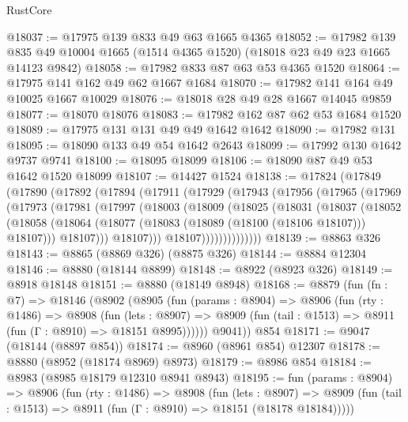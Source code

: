 \begin{lexlean}{RustCore}
\begin{coremodule}
@18037 := @17975 @139 @833 @49 @63 @1665 @4365
@18052 := @17982
    @139
    @835
    @49
    @10004
    @1665
    (@1514 @4365 @1520)
    (@18018 @23 @49 @23 @1665 @14123 @9842)
@18058 := @17982 @833 @87 @63 @53 @4365 @1520
@18064 := @17975 @141 @162 @49 @62 @1667 @1684
@18070 := @17982 @141 @164 @49 @10025 @1667 @10029
@18076 := @18018 @28 @49 @28 @1667 @14045 @9859
@18077 := @18070 @18076
@18083 := @17982 @162 @87 @62 @53 @1684 @1520
@18089 := @17975 @131 @131 @49 @49 @1642 @1642
@18090 := @17982 @131
@18095 := @18090 @133 @49 @54 @1642 @2643
@18099 := @17992 @130 @1642 @9737 @9741
@18100 := @18095 @18099
@18106 := @18090 @87 @49 @53 @1642 @1520 @18099
@18107 := @14427 @1524
@18138 := @17824
    (@17849
      (@17890
        (@17892
          (@17894
            (@17911
              (@17929
                (@17943
                  (@17956
                    (@17965
                      (@17969
                        (@17973
                          (@17981
                            (@17997
                              (@18003
                                (@18009
                                  (@18025
                                    (@18031
                                      (@18037
                                        (@18052
                                          (@18058
                                            (@18064
                                              (@18077
                                                (@18083 (@18089 (@18100 (@18106 @18107))) @18107)))
                                            @18107)))
                                      @18107)))
                                @18107))))))))))))))
@18139 := @8863 @326
@18143 := @8865 (@8869 @326) (@8875 @326)
@18144 := @8884 @12304
@18146 := @8880 (@18144 @8899)
@18148 := @8922 (@8923 @326)
@18149 := @8918 @18148
@18151 := @8880 (@18149 @8948)
@18168 := @8879
    (fun (fn : @7) =>
    @18146
      (@8902
        (@8905
          (fun (params : @8904) =>
          @8906
            (fun (rty : @1486) =>
            @8908
              (fun (lets : @8907) =>
              @8909 (fun (tail : @1513) => @8911 (fun (Γ : @8910) => @18151 @8995))))))
        @9041))
    @854
@18171 := @9047 (@18144 (@8897 @854))
@18174 := @8960 (@8961 @854) @12307
@18178 := @8880 (@8952 (@18174 @8969) @8973)
@18179 := @8986 @854
@18184 := @8983 (@8985 @18179 @12310 @8941 @8943)
@18195 := fun (params : @8904) =>
  @8906
    (fun (rty : @1486) =>
    @8908
      (fun (lets : @8907) =>
      @8909 (fun (tail : @1513) => @8911 (fun (Γ : @8910) => @18151 (@18178 @18184)))))

\end{coremodule}
\end{lexlean}
